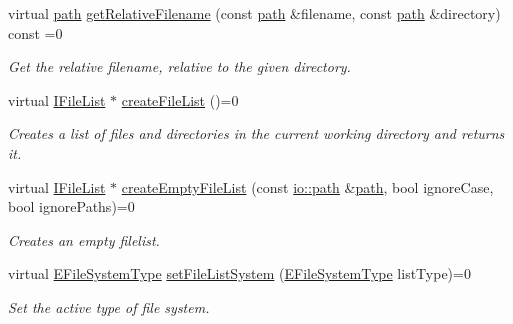 \begin{DoxyCompactItemize}
\mbox{\label{classirr_1_1io_1_1IFileSystem_a9cb85c468a6cda253ff99c88010028c7}} 
virtual \hyperlink{namespaceirr_1_1io_ab1bdc45edb3f94d8319c02bc0f840ee1}{path} \hyperlink{classirr_1_1io_1_1IFileSystem_a9cb85c468a6cda253ff99c88010028c7}{get\+Relative\+Filename} (const \hyperlink{namespaceirr_1_1io_ab1bdc45edb3f94d8319c02bc0f840ee1}{path} \&filename, const \hyperlink{namespaceirr_1_1io_ab1bdc45edb3f94d8319c02bc0f840ee1}{path} \&directory) const =0
\begin{DoxyCompactList}\small\item\em Get the relative filename, relative to the given directory. \end{DoxyCompactList}\item 
virtual \hyperlink{classirr_1_1io_1_1IFileList}{I\+File\+List} $\ast$ \hyperlink{classirr_1_1io_1_1IFileSystem_ad5820e7664377c12015ea7a6c801f7f8}{create\+File\+List} ()=0
\begin{DoxyCompactList}\small\item\em Creates a list of files and directories in the current working directory and returns it. \end{DoxyCompactList}\item 
virtual \hyperlink{classirr_1_1io_1_1IFileList}{I\+File\+List} $\ast$ \hyperlink{classirr_1_1io_1_1IFileSystem_a4f8a69f557f2b7022f6cd7346c3e85d2}{create\+Empty\+File\+List} (const \hyperlink{namespaceirr_1_1io_ab1bdc45edb3f94d8319c02bc0f840ee1}{io\+::path} \&\hyperlink{namespaceirr_1_1io_ab1bdc45edb3f94d8319c02bc0f840ee1}{path}, bool ignore\+Case, bool ignore\+Paths)=0
\begin{DoxyCompactList}\small\item\em Creates an empty filelist. \end{DoxyCompactList}\item 
\mbox{\label{classirr_1_1io_1_1IFileSystem_a767614d727f0b1ec0bc5fdaaf906169b}} 
virtual \hyperlink{namespaceirr_1_1io_a22364f1caf06442a70f6198025af3fe9}{E\+File\+System\+Type} \hyperlink{classirr_1_1io_1_1IFileSystem_a767614d727f0b1ec0bc5fdaaf906169b}{set\+File\+List\+System} (\hyperlink{namespaceirr_1_1io_a22364f1caf06442a70f6198025af3fe9}{E\+File\+System\+Type} list\+Type)=0
\begin{DoxyCompactList}\small\item\em Set the active type of file system. \end{DoxyCompactList}\item 

\end{DoxyCompactItemize}
